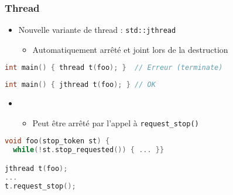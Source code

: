 \documentclass[C++.tex]{subfiles}
\begin{document}
\begin{frame}[fragile]
	\frametitle{Thread}
	\begin{itemize}
		\item Nouvelle variante de thread : \lstinline|std::jthread|
		\begin{itemize}
			\item Automatiquement arrêté et joint lors de la destruction
		\end{itemize}
	\end{itemize}


	\begin{lstlisting}[language=C++]
int main() { thread t(foo); }  // Erreur (terminate)\end{lstlisting}


	\begin{lstlisting}[language=C++]
int main() { jthread t(foo); } // OK\end{lstlisting}

	\begin{itemize}
		\item [] \begin{itemize}
			\item Peut être arrêté par l'appel à \lstinline|request_stop()|
		\end{itemize}
	\end{itemize}

	\begin{lstlisting}[language=C++]
void foo(stop_token st) {
  while(!st.stop_requested()) { ... }}

jthread t(foo);
...
t.request_stop();\end{lstlisting}
\end{frame}
\end{document}

